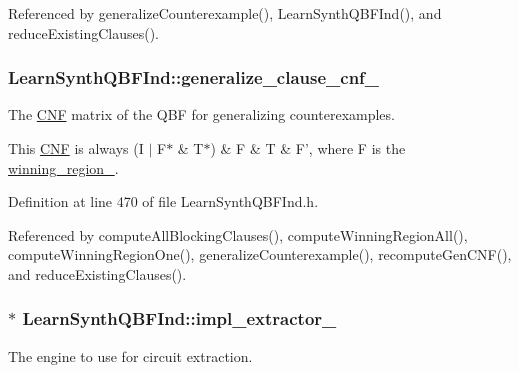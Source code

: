 Referenced by generalize\-Counterexample(), Learn\-Synth\-Q\-B\-F\-Ind(), and reduce\-Existing\-Clauses().

\hypertarget{classLearnSynthQBFInd_ad61b112cfcc60506f7b21c9ea9267b37}{
\subsubsection[{generalize\-\_\-clause\-\_\-cnf\-\_\-}]{ Learn\-Synth\-Q\-B\-F\-Ind\-::generalize\-\_\-clause\-\_\-cnf\-\_\-\hspace{0.3cm}{\ttfamily [protected]}}}\label{classLearnSynthQBFInd_ad61b112cfcc60506f7b21c9ea9267b37}


The \hyperlink{classCNF}{C\-N\-F} matrix of the Q\-B\-F for generalizing counterexamples. 

This \hyperlink{classCNF}{C\-N\-F} is always (I $\vert$ F$\ast$ \& T$\ast$) \& F \& T \& F', where F is the \hyperlink{classLearnSynthQBFInd_ab8ce6031137413e90e0626bbdc734be0}{winning\-\_\-region\-\_\-}. 

Definition at line 470 of file Learn\-Synth\-Q\-B\-F\-Ind.\-h.



Referenced by compute\-All\-Blocking\-Clauses(), compute\-Winning\-Region\-All(), compute\-Winning\-Region\-One(), generalize\-Counterexample(), recompute\-Gen\-C\-N\-F(), and reduce\-Existing\-Clauses().

\hypertarget{classLearnSynthQBFInd_a8c285416b6f27e86bdda92fd578327b8}{
\subsubsection[{impl\-\_\-extractor\-\_\-}]{$\ast$ Learn\-Synth\-Q\-B\-F\-Ind\-::impl\-\_\-extractor\-\_\-\hspace{0.3cm}{\ttfamily [protected]}}}\label{classLearnSynthQBFInd_a8c285416b6f27e86bdda92fd578327b8}


The engine to use for circuit extraction. 


